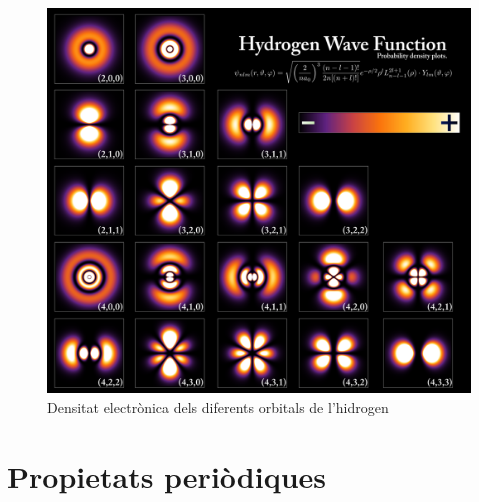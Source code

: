 \begin{figure}[h]
\centering
\includegraphics[scale=0.25]{figures/Hydrogen_Density_Plots.png}
\caption{Densitat electrònica dels diferents orbitals de l'hidrogen}
\label{fig:Hydrogen_Density_Plots}
\end{figure}






\section{Propietats periòdiques}

